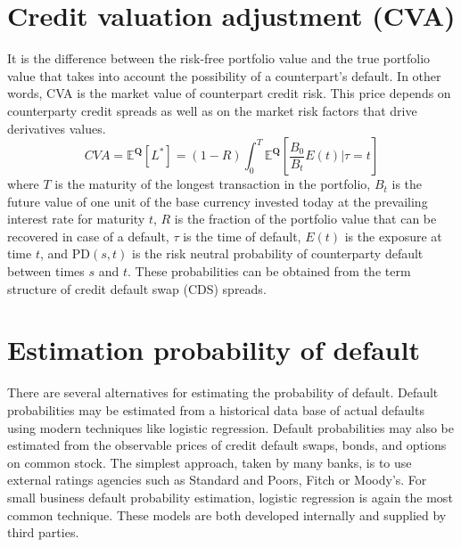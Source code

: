 \documentclass{book}
\begin{document}
\section{Credit valuation adjustment (CVA)}
It is the difference between the risk-free portfolio value and the true portfolio value that takes into account the possibility of a counterpart's default. In other words, CVA is the market value of counterpart credit risk. This price depends on counterparty credit spreads as well as on the market risk factors that drive derivatives values.
$$
CVA=\mathbb{E}^{\mathbf{Q}}[L^{\ast}]=(1-R)\int_{0}^{T}\mathbb{E}^{\mathbf{Q}}\left[\frac{B_{0}}{B_{t}}E(t)|\tau=t \right]
$$
where $T$ is the maturity of the longest transaction in the portfolio,  $B_{t}$  is the future value of one unit of the base currency invested today at the prevailing interest rate for maturity $t$, $R$ is the fraction of the portfolio value that can be recovered in case of a default, $\tau$ is the time of default, $E(t)$ is the exposure at time $t$, and  $\mathrm{PD}(s,t)$ is the risk neutral probability of counterparty default between times $s$ and $t$. These probabilities can be obtained from the term structure of credit default swap (CDS) spreads.
\section{Estimation probability of default}
There are several alternatives for estimating the probability of default. Default probabilities may be estimated from a historical data base of actual defaults using modern techniques like logistic regression. Default probabilities may also be estimated from the observable prices of credit default swaps, bonds, and options on common stock. The simplest approach, taken by many banks, is to use external ratings agencies such as Standard and Poors, Fitch or Moody's. For small business default probability estimation, logistic regression is again the most common technique. These models are both developed internally and supplied by third parties.
\end{document}
